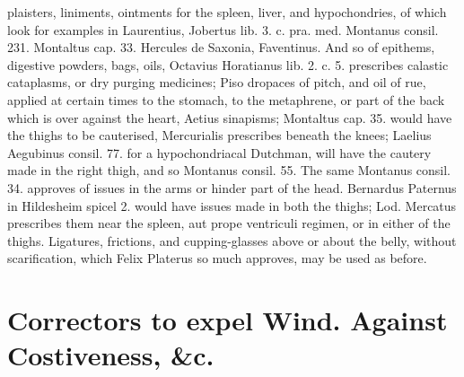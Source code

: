 plaisters, liniments, ointments for the spleen, liver, and
hypochondries, of which look for examples in Laurentius, Jobertus lib.
3. c. pra. med. Montanus consil. 231. Montaltus cap. 33. Hercules de
Saxonia, Faventinus. And so of epithems, digestive powders, bags, oils,
Octavius Horatianus lib. 2. c. 5. prescribes calastic cataplasms, or
dry purging medicines; Piso dropaces of pitch, and oil of rue,
applied at certain times to the stomach, to the metaphrene, or part of
the back which is over against the heart, Aetius sinapisms; Montaltus
cap. 35. would have the thighs to be cauterised, Mercurialis
prescribes beneath the knees; Laelius Aegubinus consil. 77. for a
hypochondriacal Dutchman, will have the cautery made in the right
thigh, and so Montanus consil. 55. The same Montanus consil. 34.
approves of issues in the arms or hinder part of the head. Bernardus
Paternus in Hildesheim spicel 2. would have  issues made in both
the thighs; Lod. Mercatus prescribes them near the spleen, aut
prope ventriculi regimen, or in either of the thighs. Ligatures,
frictions, and cupping-glasses above or about the belly, without
scarification, which Felix Platerus so much approves, may be used
as before.

\section[To expel Wind. Against Constipation]{Correctors to expel Wind. Against Costiveness, \&c.}

